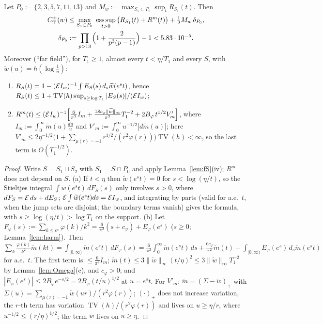 \begin{proposition}\label{prop:CTfixed}
Let $P_0:=\{2,3,5,7,11,13\}$ and $M_w:=\max_{S_1\subset P_0}\sup_tR_{S_1}(t)$. Then
\begin{gather*}
 \CTp(w)\le\max_{S_1\subset P_0}\ \operatorname*{ess\,sup}_{t>0}\big(R_{S_1}(t)+R^m(t)\big)+\tfrac12M_w\,\delta_{P_0},\\
 \delta_{P_0}:=\prod_{p>13}\Big(1+\frac2{p^3(p-1)}\Big)-1<5.83\cdot10^{-5}.
\end{gather*}
Moreover (``far field''), for $T_1\ge1$, almost every $t<\eta/T_1$ and every $S$, with $\widetilde w(u)=h(\log\frac1u)$:
\begin{enumerate}
\item[(a)] $R_S(t)=1-(\mathcal{E}I_w)^{-1}\int E_S(s)\,d_s\widetilde w(e^{s}t)$, hence
 $R_S(t)\le1+\operatorname{TV}(h)\sup_{s\ge\log T_1}|E_S(s)|/(\mathcal{E}I_w)$;
\item[(b)] $R^m(t)\le(\mathcal{E}I_w)^{-1}\Big[\frac6{\pi^2}I_m+\frac{18c_\varphi\|\widetilde w\|_\infty}{\pi^2}T_1^{-2}+2B_\varphi\,t^{1/2}V'_m\Big]$, where
 $I_m:=\int_0^\infty\widetilde m(u)\frac{du}u$ and $V'_m:=\int_0^\infty u^{-1/2}|d\widetilde m(u)|$; here
 $V'_m\le2\eta^{-1/2}\big(1+\sum_{\mu(r)=-1}r^{1/2}/(r^2\varphi(r))\big)\operatorname{TV}(h)<\infty$, so the last term is $O(T_1^{-1/2})$.
\end{enumerate}
\end{proposition}

\begin{proof}
Write $S=S_1\sqcup S_2$ with $S_1=S\cap P_0$ and apply Lemma~\ref{lem:fS}(iv); $R^m$ does not depend on $S$.
(a) If $t<\eta$ then $\widetilde w(e^st)=0$ for $s<\log(\eta/t)$, so the Stieltjes integral $\int\widetilde w(e^st)\,dF_S(s)$ only involves $s>0$,
where $dF_S=\mathcal{E}\,ds+dE_S$; $\mathcal{E}\int\widetilde w(e^st)ds=\mathcal{E}I_w$, and integrating by parts (valid for a.e.\ $t$, when the jump sets are
disjoint; the boundary terms vanish) gives the formula, with $s\ge\log(\eta/t)>\log T_1$ on the support.
(b) Let $F_\varphi(s):=\sum_{k\le e^s}\varphi(k)/k^2=\frac6{\pi^2}(s+c_\varphi)+E_\varphi(e^s)$ ($s\ge0$; Lemma~\ref{lem:harm}). Then
$\sum_k\frac{\varphi(k)}{k^2}\widetilde m(kt)=\int_{[0,\infty)}\widetilde m(e^st)\,dF_\varphi(s)=\frac6{\pi^2}\int_0^\infty\widetilde m(e^st)\,ds+\frac{6c_\varphi}{\pi^2}\widetilde m(t)
-\int_{[0,\infty)}E_\varphi(e^s)\,d_s\widetilde m(e^st)$ for a.e.\ $t$. The first term is $\le\frac6{\pi^2}I_m$; $\widetilde m(t)\le3\|\widetilde w\|_\infty(t/\eta)^2\le3\|\widetilde w\|_\infty T_1^{-2}$ by
Lemma~\ref{lem:Omega}(c), and $c_\varphi>0$; and $|E_\varphi(e^s)|\le2B_\varphi e^{-s/2}=2B_\varphi(t/u)^{1/2}$ at $u=e^st$. For $V'_m$: $\widetilde m=(\Sigma-\widetilde w)_+$ with
$\Sigma(u)=\sum_{\mu(r)=-1}\widetilde w(ur)/(r^2\varphi(r))$; $(\cdot)_+$ does not increase variation, the $r$-th term has variation
$\operatorname{TV}(h)/(r^2\varphi(r))$ and lives on $u\ge\eta/r$, where $u^{-1/2}\le(r/\eta)^{1/2}$; the term $\widetilde w$ lives on $u\ge\eta$.
\end{proof}

